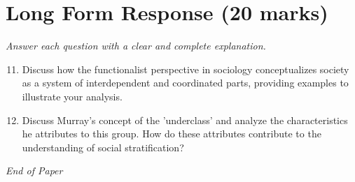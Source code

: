 \documentclass[12pt]{article}
\begin{document}
\section*{Long Form Response (20 marks)}
\textit{Answer each question with a clear and complete explanation.}
\begin{enumerate}[label=\arabic*.]
\setcounter{enumi}{10}
\item Discuss how the functionalist perspective in sociology conceptualizes society as a system of interdependent and coordinated parts, providing examples to illustrate your analysis.
\item Discuss Murray's concept of the 'underclass' and analyze the characteristics he attributes to this group. How do these attributes contribute to the understanding of social stratification?
\end{enumerate}

\vfill
\noindent\textit{End of Paper}
\end{document}
